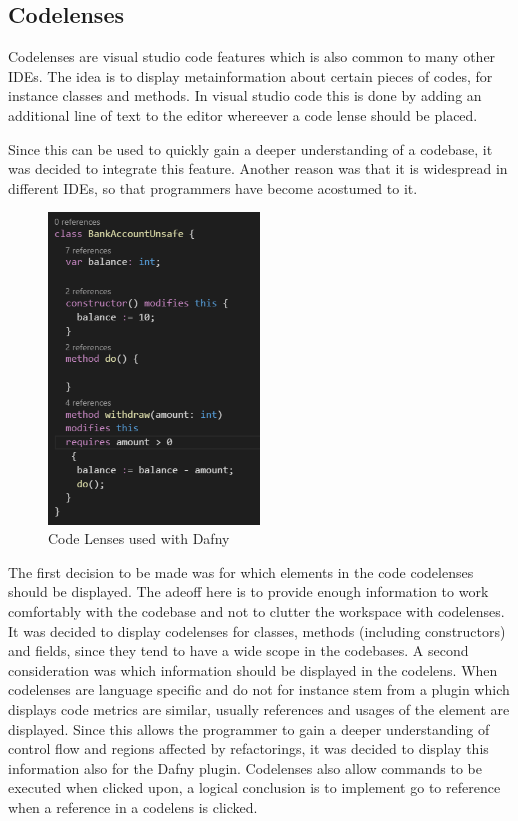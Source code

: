 \subsection{Codelenses} \label{codelenses}
Codelenses are visual studio code features which is also common to many other IDEs. The idea is to display metainformation about certain pieces of codes, for instance classes and methods. In visual studio code this is done  by adding an additional line of text to the editor whereever a code lense should  be placed. \newline

Since this can be used to quickly gain a deeper understanding of a codebase, it was decided to integrate this feature. Another reason was that it is widespread in different IDEs, so that programmers have become acostumed to it. \newline

\begin{figure}[H]
	\centering
	\includegraphics[width=0.5\textwidth]{img/codelensesClosed}
	\caption{Code Lenses used with Dafny}
	\label{fig:codelensesclosed}
\end{figure}

The first decision to be made was for which elements in the code codelenses should be displayed. The adeoff here is to  provide enough information to work comfortably with the codebase and not to clutter the workspace with codelenses. It was decided to display codelenses for classes, methods (including constructors) and fields, since they tend to have a wide scope in the codebases. \newline
A second consideration was which information should be displayed in the codelens. When codelenses are language specific and do not for instance stem from a plugin which displays code metrics are similar, usually references and usages of the element are displayed. Since this allows the programmer to gain a deeper understanding of control flow and regions affected by refactorings, it was decided to display this information also for the Dafny plugin. Codelenses also allow commands to be executed when clicked upon, a logical conclusion is to implement go to reference when a reference in a codelens is clicked.\newline

